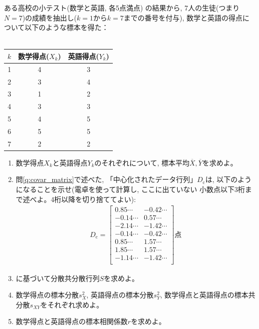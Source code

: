 \begin{q}\label{q:PCA_001} ある高校の小テスト(数学と英語, 各5点満点)
の結果から, 7人の生徒(つまり$N=7$)の成績を抽出し($k=1$から$k=7$までの番号を付与), 
数学と英語の得点について以下のような標本を得た：\\
\\
\begin{tabular}{ccc}\hline
$k$ & 数学得点($X_k$) & 英語得点($Y_k$)\\ \hline
1&	4&	3\\
2&	3&	4\\
3&	1&	2\\
4&	3&	3\\
5&	4&	5\\
6&	5&	5\\
7&	2&	2\\ \hline
\end{tabular}
\begin{enumerate}
\item 数学得点$X_k$と英語得点$Y_k$のそれぞれについて, 標本平均$\overline{X}, \overline{Y}$を求めよ。
\item 問\ref{q:covar_matrix}で述べた, 「中心化されたデータ行列」$D_{\text{c}}$は, 
以下のようになることを示せ(電卓を使って計算し, ここに出ていない
小数点以下3桁まで述べよ。4桁以降を切り捨ててよい):
\begin{eqnarray}D_{\text{c}}=\begin{bmatrix}
 0.85\cdots 	 & -0.42\cdots\\
-0.14\cdots	 & 0.57\cdots\\
-2.14\cdots	 & -1.42\cdots\\
-0.14\cdots	 & -0.42\cdots\\
 0.85\cdots	 & 1.57\cdots\\
 1.85\cdots	 & 1.57\cdots\\
-1.14\cdots    & -1.42\cdots\\
\end{bmatrix}\text{点}\label{eq:PCA_001_D}\end{eqnarray}
\item {}に基づいて分散共分散行列$S$を求めよ。
\item 数学得点の標本分散$s_{X}^2$, 英語得点の標本分散$s_{Y}^2$, 数学得点と英語得点の標本共分散$s_{XY}$をそれぞれ求めよ。
\item 数学得点と英語得点の標本相関係数$r$を求めよ。
\end{enumerate}
\end{q}
\mv

